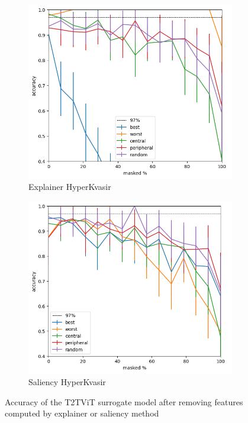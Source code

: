 \documentclass[magisterska,en]{pracamgr}
\begin{document}
\begin{figure}
\centering
\begin{subfigure}{.7\textwidth}
  \centering
  \includegraphics[width=.8\linewidth]{./images/t2t_vit_gastro_masking_explainer_patches_accuracy_half-0.png}
  \caption{Explainer HyperKvasir}
  \label{fig:sub1}
\end{subfigure}%
\begin{subfigure}{.7\textwidth}
  \centering
  \includegraphics[width=.8\linewidth]
{./images/t2t_vit_gastro_masking_saliency_patches_accuracy_half-0.png}
  \caption{Saliency HyperKvasir}
  \label{fig:sub2}
\end{subfigure}
\caption{Accuracy of the T2T\textunderscore ViT  surrogate model after removing features computed by explainer or saliency method}
\label{fig:T2T_ViT_Saliency_Explainer_HyperKvasir}
\end{figure}
\end{document}
